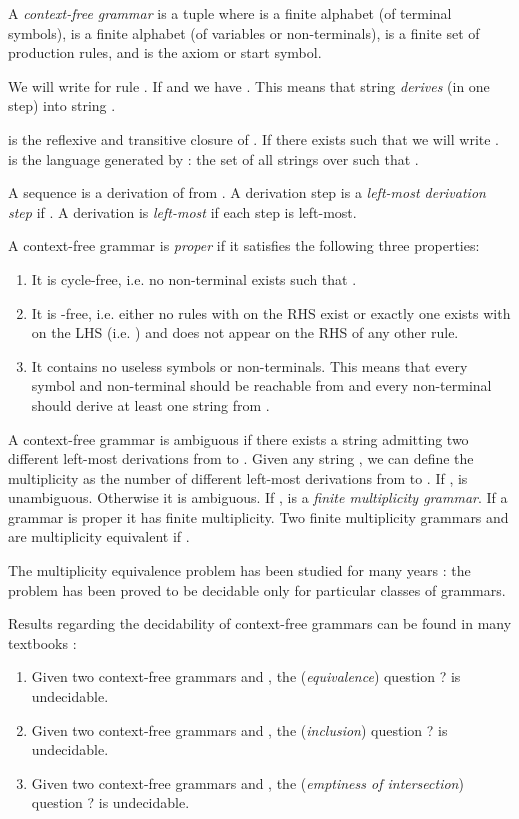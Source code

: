 \documentclass[submission]{eptcs} \usepackage{breakurl}             \usepackage[english]{babel}
\begin{document}
A \emph{context-free grammar} is a tuple  where  is a finite alphabet (of terminal symbols), 
is a finite alphabet (of variables or non-terminals),  is a finite set of production rules, and
  is the axiom or start symbol.


We will write  for rule . If
 and   we have
. This means that string 
\emph{derives} (in one step) into string .


is the reflexive and transitive closure of . If there
exists  such that  we will
write .  is the language generated by : the set of all strings  over  such that .

A sequence  is a derivation of  from . A derivation step  is a \emph{left-most derivation step} if . A derivation is \emph{left-most} if each step is left-most.

A context-free grammar is \emph{proper} if it satisfies the following three properties:
\begin{enumerate}
\item It is cycle-free, i.e. no non-terminal  exists such that .
\item It is -free, i.e. either no rules with  on the RHS exist or exactly one exists with  on the LHS (i.e. ) and  does not appear on the RHS of any other rule.
\item It contains no useless symbols or non-terminals. This means that every symbol and non-terminal should be reachable from  and every non-terminal should derive at least one string from .
\end{enumerate}

A context-free grammar is ambiguous if there exists a string  admitting two different left-most derivations from  to . Given any string , we can define the multiplicity  as the number of different left-most derivations from  to . If ,  is unambiguous. Otherwise it is ambiguous. If ,  is a \emph{finite multiplicity grammar}. If a grammar is proper it has finite multiplicity. Two finite multiplicity grammars  and  are multiplicity equivalent if .

The multiplicity equivalence problem has been studied for many years \cite{kuic86}: the problem has been proved to be decidable only for particular classes of grammars.


Results regarding the decidability of context-free grammars can be found in many textbooks \cite{harr78}:
\begin{enumerate}
\item  Given two context-free grammars  and , the (\emph{equivalence}) question ? is undecidable.
\item  Given two context-free grammars  and , the (\emph{inclusion}) question ? is undecidable.
\item  Given two context-free grammars  and , the (\emph{emptiness of intersection}) question ? is undecidable.
\end{enumerate}
\end{document}
